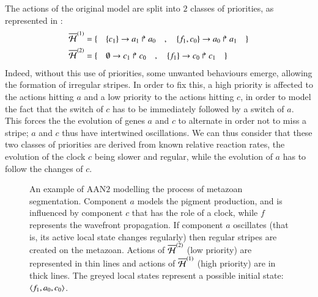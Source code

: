 The actions of the original model are split into $2$ classes of priorities, as represented in :
\begin{align*}
  \overline{\mathcal{H}}^{(1)} = \{ \quad
    & \{c_1\}\rightarrow a_1\Rsh a_0 \quad , \quad
    \{f_1, c_0\}\rightarrow a_0\Rsh a_1
  \quad \} \\
  \overline{\mathcal{H}}^{(2)} = \{ \quad
    & \emptyset\rightarrow c_1\Rsh c_0 \quad , \quad
    \{f_1\}\rightarrow c_0\Rsh c_1
  \quad \} \\
\end{align*}
Indeed, without this use of priorities,
some unwanted behaviours emerge, allowing the formation of irregular stripes.
In order to fix this, a high priority is affected to the actions hitting $a$
and a low priority to the actions hitting $c$,
in order to model the fact that the switch of $c$ has to be immediately followed by
a switch of $a$.
This forces the the evolution of genes $a$ and $c$
to alternate in order not to miss a stripe;
$a$ and $c$ thus have intertwined oscillations.
We can thus consider that these two classes of priorities
are derived from known relative reaction rates,
the evolution of the clock $c$ being slower and regular,
while the evolution of $a$ has to follow the changes of $c$.

\begin{figure}[p]
  \centering
  \caption{
  \label{fig:metazoan-php}
    An example of AAN$2$
    modelling the process of metazoan segmentation.
    Component $a$ models the pigment production, and is influenced by
    component $c$ that has the role of a clock,
    while $f$ represents the wavefront propagation.
    If component $a$ oscillates (that is, its active local state changes regularly)
    then regular stripes are created on the metazoan.
    Actions of $\overline{\mathcal{H}}^{(2)}$ (low priority) are represented in thin lines
    and actions of $\overline{\mathcal{H}}^{(1)}$ (high priority) are in thick lines.
    The greyed local states represent a possible initial state:
    $\mbox{$\langle f_1, a_0, c_0 \rangle$}$.
  }
\end{figure}

